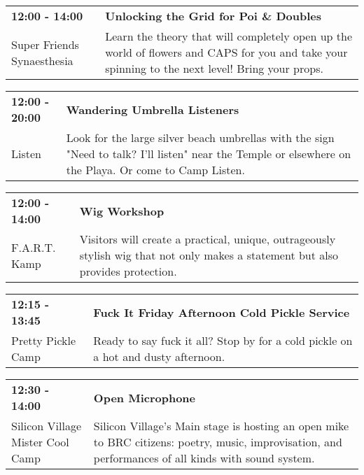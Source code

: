 \begin{tabular}{ p{1in} p{2.2in} }
    \textbf{12:00 - 14:00} & \textbf{Unlocking the Grid for Poi \& Doubles} \\
    Super Friends Synaesthesia \newline  & Learn the theory that will completely open up the world of flowers and CAPS for you and take your spinning to the next level! Bring your props. \\
    \hline 
\end{tabular}
    
\begin{tabular}{ p{1in} p{2.2in} }
    \textbf{12:00 - 20:00} & \textbf{Wandering Umbrella Listeners} \\
    Listen \newline  & Look for the large silver beach umbrellas with the sign "Need to talk? I'll listen" near the Temple or elsewhere on the Playa. Or come to Camp Listen. \\
    \hline 
\end{tabular}
    
\begin{tabular}{ p{1in} p{2.2in} }
    \textbf{12:00 - 14:00} & \textbf{Wig Workshop} \\
    F.A.R.T. Kamp \newline  & Visitors will create a practical, unique, outrageously stylish wig that not only makes a statement but also provides protection. \\
    \hline 
\end{tabular}
    
\begin{tabular}{ p{1in} p{2.2in} }
    \textbf{12:15 - 13:45} & \textbf{Fuck It Friday Afternoon Cold Pickle Service} \\
    Pretty Pickle Camp \newline  & Ready to say fuck it all? Stop by for a cold pickle on a hot and dusty afternoon. \\
    \hline 
\end{tabular}
    
\begin{tabular}{ p{1in} p{2.2in} }
    \textbf{12:30 - 14:00} & \textbf{Open Microphone} \\
    Silicon Village \newline Mister Cool Camp & Silicon Village's Main stage is hosting an open mike to BRC citizens: poetry, music, improvisation, and performances of all kinds with sound system. \\
    \hline 
\end{tabular}
    

